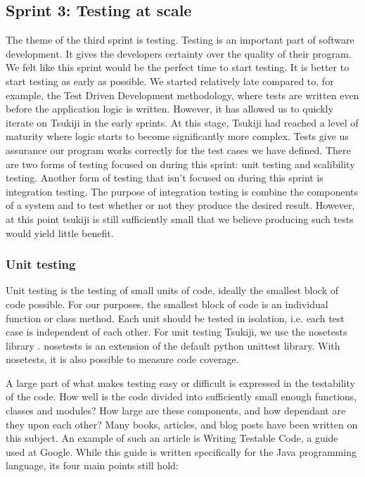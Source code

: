 \subsection{Sprint 3: Testing at scale}
\label{methodoloy:sprint3}
The theme of the third sprint is testing.
Testing is an important part of software development.
It gives the developers certainty over the quality of their program.
We felt like this sprint would be the perfect time to start testing.
It is better to start testing as early as possible.
We started relatively late compared to, for example, the Test Driven Development methodology, where tests are written even before the application logic is written.
However, it has allowed us to quickly iterate on Tsukiji in the early sprints.
At this stage, Tsukiji had reached a level of maturity where logic starts to become significantly more complex.
Tests give us assurance our program works correctly for the test cases we have defined.
There are two forms of testing focused on during this sprint: unit testing and scalibility testing.
Another form of testing that isn't focused on during this sprint is integration testing.
The purpose of integration testing is combine the components of a system and to test whether or not they produce the desired result.
However, at this point tsukiji is still sufficiently small that we believe producing such tests would yield little benefit.

\subsubsection{Unit testing}
Unit testing is the testing of small units of code, ideally the smallest block of code possible.
For our purposes, the smallest block of code is an individual function or class method.
Each unit should be tested in isolation, i.e. each test case is independent of each other.
For unit testing Tsukiji, we use the nosetests library \cite{nosetests}.
nosetests is an extension of the default python unittest library.
With nosetests, it is also possible to measure code coverage.

A large part of what makes testing easy or difficult is expressed in the testability of the code.
How well is the code divided into sufficiently small enough functions, classes and modules?
How large are these components, and how dependant are they upon each other?
Many books, articles, and blog posts have been written on this subject.
An example of such an article is Writing Testable Code\cite{writingtestablecode}, a guide used at Google.
While this guide is written specifically for the Java programming language, its four main points still hold:

